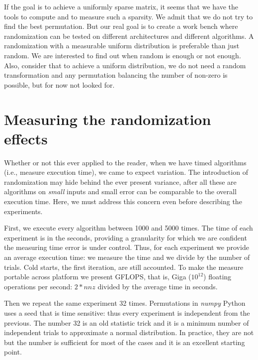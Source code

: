 \documentclass[manuscript,screen]{acmart}
\begin{document}

If the goal is to achieve a uniformly sparse matrix, it seems that we
have the tools to compute and to measure such a sparsity. We admit
that we do not try to find the best permutation. But our real goal is
to create a work bench where randomization can be tested on different
architectures and different algorithms. A randomization with a
measurable uniform distribution is preferable than just random. We are
interested to find out when random is enough or not enough. Also,
consider that to achieve a uniform distribution, we do not need a
random transformation and any permutation balancing the number of
non-zero is possible, but for now not looked for.

\section{Measuring the randomization effects}
\label{sec:measuring}

Whether or not this ever applied to the reader, when we have timed
algorithms (i.e., measure execution time), we came to expect
variation.  The introduction of randomization may hide behind the ever
present variance, after all these are algorithms on {\em small} inputs
and small error can be comparable to the overall execution time. Here,
we must address this concern even before describing the experiments.

First, we execute every algorithm between 1000 and 5000 times. The
time of each experiment is in the seconds, providing a granularity for
which we are confident the measuring time error is under
control. Thus, for each experiment we provide an average execution
time: we measure the time and we divide by the number of trials. Cold
starts, the first iteration, are still accounted. To make the measure
portable across platform we present GFLOPS, that is, Giga ($10^{12}$)
floating operations per second: $2*nnz$ divided by the average time in
seconds.

Then we repeat the same experiment 32 times. Permutations in {\em
  numpy} Python uses a seed that is time sensitive: thus every
experiment is independent from the previous. The number 32 is an old
statistic trick and it is a minimum number of independent trials to
approximate a normal distribution. In practice, they are not but the
number is sufficient for most of the cases and it is an excellent
starting point.
\end{document}
